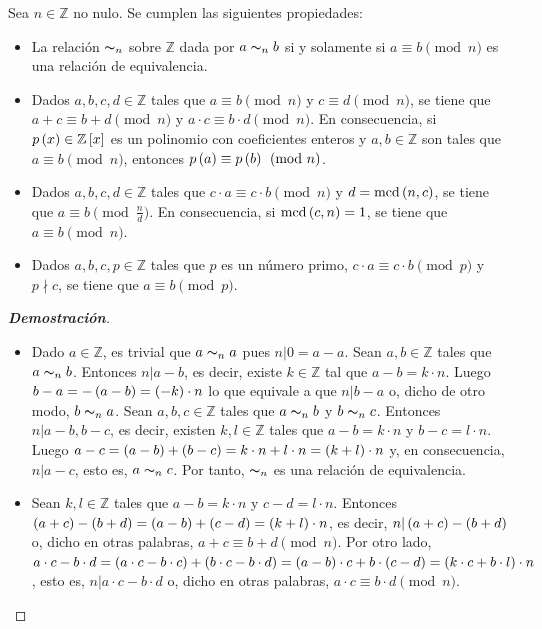 \begin{proposition}
  \rm Sea $n\in\mathbb{Z}$ no nulo. Se cumplen las siguientes propiedades:
  \begin{itemize}
    \item[1.] La relación $\thicksim_n$ sobre $\mathbb{Z}$ dada por $a\thicksim_n b$ si y solamente si $a\equiv b\pmod{n}$ es una relación de equivalencia.
    \item[2.] Dados $a,b,c,d\in\mathbb{Z}$ tales que $a\equiv b\pmod{n}$ y $c\equiv d\pmod{n}$, se tiene que $a+c\equiv b+d\pmod{n}$ y $a\cdot c\equiv b\cdot d\pmod{n}$. En consecuencia, si $p\left(x\right)\in\mathbb{Z}\left[x\right]$ es un polinomio con coeficientes enteros y $a,b\in\mathbb{Z}$ son tales que $a\equiv b\pmod{n}$, entonces $p\left(a\right)\equiv p\left(b\right)\pmod{n}$.
    \item[3.] Dados $a,b,c,d\in\mathbb{Z}$ tales que $c\cdot a\equiv c\cdot b\pmod{n}$ y $d=\text{mcd}\left(n,c\right)$, se tiene que $a\equiv b\pmod{\frac{n}{d}}$. En consecuencia, si $\text{mcd}\left(c,n\right)=1$, se tiene que $a\equiv b\pmod{n}$.
    \item[4.] Dados $a,b,c,p\in\mathbb{Z}$ tales que $p$ es un número primo, $c\cdot a\equiv c\cdot b\pmod{p}$ y $p\nmid c$, se tiene que $a\equiv b\pmod{p}$.
  \end{itemize}
  \begin{proof}[\rm\textbf{Demostración}]
    \hfill
    \begin{itemize}
      \item[1.] Dado $a\in\mathbb{Z}$, es trivial que $a\thicksim_n a$ pues $n|0=a-a$. Sean $a,b\in\mathbb{Z}$ tales que $a\thicksim_n b$. Entonces $n|a-b$, es decir, existe $k\in\mathbb{Z}$ tal que $a-b=k\cdot n$. Luego $b-a=-\left(a-b\right)=\left(-k\right)\cdot n$ lo que equivale a que $n|b-a$ o, dicho de otro modo, $b\thicksim_n a$. Sean $a,b,c\in\mathbb{Z}$ tales que $a\thicksim_n b$ y $b\thicksim_n c$. Entonces $n|a-b,b-c$, es decir, existen $k,l\in\mathbb{Z}$ tales que $a-b=k\cdot n$ y $b-c=l\cdot n$. Luego $a-c=\left(a-b\right)+\left(b-c\right)=k\cdot n+l\cdot n=\left(k+l\right)\cdot n$ y, en consecuencia, $n|a-c$, esto es, $a\thicksim_n c$. Por tanto, $\thicksim_n$ es una relación de equivalencia.
      \item[2.] Sean $k,l\in\mathbb{Z}$ tales que $a-b=k\cdot n$ y $c-d=l\cdot n$. Entonces $\left(a+c\right)-\left(b+d\right)=\left(a-b\right)+\left(c-d\right)=\left(k+l\right)\cdot n$, es decir, $n|\left(a+c\right)-\left(b+d\right)$ o, dicho en otras palabras, $a+c\equiv b+d\pmod{n}$. Por otro lado, $a\cdot c-b\cdot d=\left(a\cdot c-b\cdot c\right)+\left(b\cdot c-b\cdot d\right)=\left(a-b\right)\cdot c+b\cdot\left(c-d\right)=\left(k\cdot c+b\cdot l\right)\cdot n$, esto es, $n|a\cdot c-b\cdot d$ o, dicho en otras palabras, $a\cdot c\equiv b\cdot d\pmod{n}$.

\end{itemize}
\end{proof}
\end{proposition}

